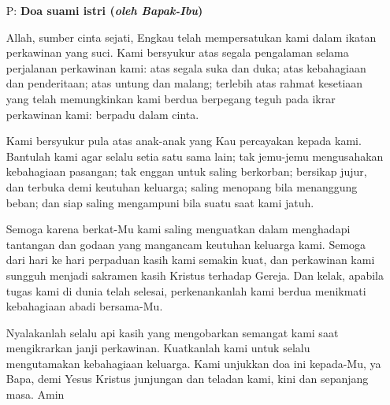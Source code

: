 \documentclass[a5paper,12pt,openany]{scrbook}
\newcommand{\BP}[1]{\begin{itemize} \item[P:] #1 \end{itemize}}
\begin{document}
\BP{\textbf{Doa suami istri (\textit{oleh Bapak-Ibu})}

Allah, sumber cinta sejati, Engkau telah mempersatukan kami dalam ikatan perkawinan yang suci. Kami bersyukur atas segala pengalaman selama perjalanan perkawinan kami: atas segala suka dan duka; atas kebahagiaan dan penderitaan; atas untung dan malang; terlebih atas rahmat kesetiaan yang telah memungkinkan kami berdua berpegang teguh pada ikrar perkawinan kami: berpadu dalam cinta.

Kami bersyukur pula atas anak-anak yang Kau percayakan kepada kami. Bantulah kami agar selalu setia satu sama lain; tak jemu-jemu mengusahakan kebahagiaan pasangan; tak enggan untuk saling berkorban; bersikap jujur, dan terbuka demi keutuhan keluarga; saling menopang bila menanggung beban; dan siap saling mengampuni bila suatu saat kami jatuh.

Semoga karena berkat-Mu kami saling menguatkan dalam menghadapi tantangan dan godaan yang mangancam keutuhan keluarga kami. Semoga dari hari ke hari perpaduan kasih kami semakin kuat, dan perkawinan kami sungguh menjadi sakramen kasih Kristus terhadap Gereja. Dan kelak, apabila tugas kami di dunia telah selesai, perkenankanlah kami berdua menikmati kebahagiaan abadi bersama-Mu.

Nyalakanlah selalu api kasih yang mengobarkan semangat kami saat mengikrarkan janji perkawinan. Kuatkanlah kami untuk selalu mengutamakan kebahagiaan keluarga.
Kami unjukkan doa ini kepada-Mu, ya Bapa, demi Yesus Kristus junjungan dan teladan kami, kini dan sepanjang masa. Amin}
\end{document}
